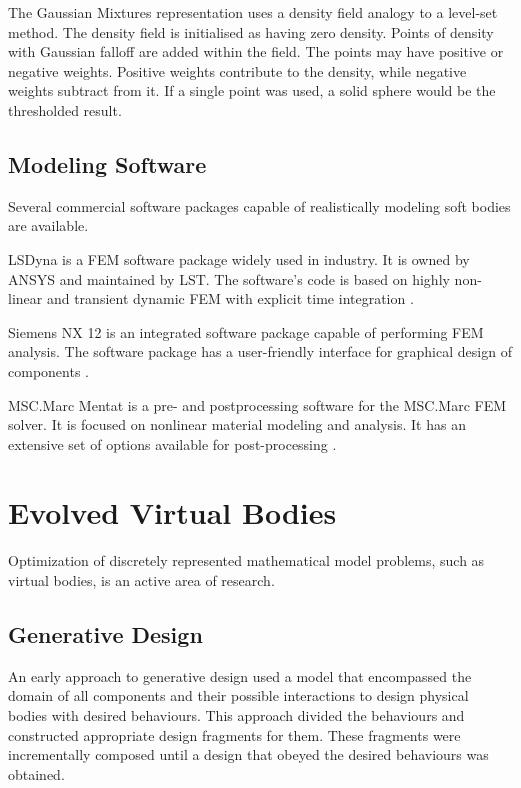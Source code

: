 The Gaussian Mixtures representation uses a density field analogy to a level-set method. The density field is initialised as having zero density. Points of density with Gaussian falloff are added within the field. The points may have positive or negative weights. Positive weights contribute to the density, while negative weights subtract from it. If a single point was used, a solid sphere would be the thresholded result. 

\subsection{Modeling Software}

Several commercial software packages capable of realistically modeling soft bodies are available.

LSDyna is a FEM software package widely used in industry. It is owned by ANSYS and maintained by LST. The software's code is based on highly non-linear and transient dynamic FEM with explicit time integration \cite{LSDyna}.

Siemens NX 12 is an integrated software package capable of performing FEM analysis. The software package has a user-friendly interface for graphical design of components \cite{NX12}.

MSC.Marc Mentat is a pre- and postprocessing software for the MSC.Marc FEM solver. It is focused on nonlinear material modeling and analysis. It has an extensive set of options available for post-processing \cite{MSC}.

\section{Evolved Virtual Bodies}

Optimization of discretely represented mathematical model problems, such as virtual bodies, is an active area of research.

\subsection{Generative Design}

An early approach to generative design used a model that encompassed the domain of all components and their possible interactions to design physical bodies with desired behaviours. This approach divided the behaviours and constructed appropriate design fragments for them. These fragments were incrementally composed until a design that obeyed the desired behaviours was obtained. \cite{Brose1993} 

